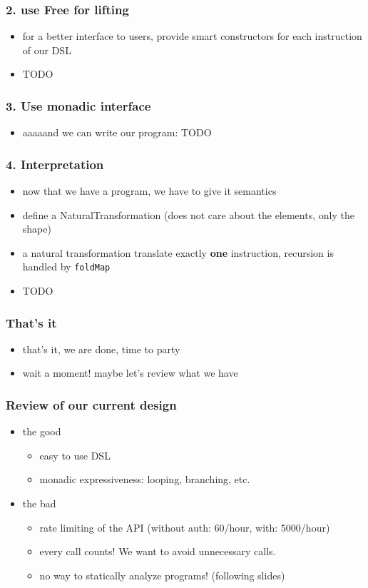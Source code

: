\documentclass[compress]{beamer}
\begin{document}
\begin{frame}
  \frametitle{2. use Free for lifting}
  \begin{itemize}
  \item for a better interface to users, provide smart constructors
    for each instruction of our DSL
  \item TODO
  \end{itemize}
\end{frame}

\begin{frame}
  \frametitle{3. Use monadic interface}
  \begin{itemize}
  \item aaaaand we can write our program:
    TODO
  \end{itemize}
\end{frame}

\begin{frame}
  \frametitle{4. Interpretation}
  \begin{itemize}
  \item now that we have a program, we have to give it semantics
  \item define a NaturalTransformation (does not care about the
    elements, only the shape)
  \item a natural transformation translate exactly \textbf{one}
    instruction, recursion is handled by \texttt{foldMap}
  \item TODO
  \end{itemize}
\end{frame}

\begin{frame}
  \frametitle{That's it}
  \begin{itemize}
  \item that's it, we are done, time to party
  \item wait a moment! maybe let's review what we have
  \end{itemize}
\end{frame}

\begin{frame}
  \frametitle{Review of our current design}
  \begin{itemize}
  \item the good
    \begin{itemize}
    \item easy to use DSL
    \item monadic expressiveness: looping, branching, etc.
    \end{itemize}
  \item the bad
    \begin{itemize}
    \item rate limiting of the API (without auth: 60/hour, with:
      5000/hour)
    \item every call counts! We want to avoid unnecessary calls.
    \item no way to statically analyze programs! (following slides)
    \end{itemize}
  \end{itemize}
\end{frame}
\end{document}
